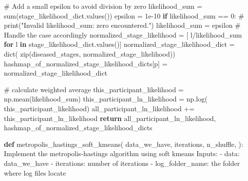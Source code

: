 \documentclass[
  letterpaper,
  DIV=11,
  numbers=noendperiod]{scrreprt}
\newenvironment{Shaded}{\begin{snugshade}}{\end{snugshade}}
\newcommand{\BuiltInTok}[1]{\textcolor[rgb]{0.00,0.23,0.31}{#1}}
\newcommand{\CommentTok}[1]{\textcolor[rgb]{0.37,0.37,0.37}{#1}}
\newcommand{\ControlFlowTok}[1]{\textcolor[rgb]{0.00,0.23,0.31}{\textbf{#1}}}
\newcommand{\DecValTok}[1]{\textcolor[rgb]{0.68,0.00,0.00}{#1}}
\newcommand{\FloatTok}[1]{\textcolor[rgb]{0.68,0.00,0.00}{#1}}
\newcommand{\KeywordTok}[1]{\textcolor[rgb]{0.00,0.23,0.31}{\textbf{#1}}}
\newcommand{\NormalTok}[1]{\textcolor[rgb]{0.00,0.23,0.31}{#1}}
\newcommand{\OperatorTok}[1]{\textcolor[rgb]{0.37,0.37,0.37}{#1}}
\begin{document}
\begin{Shaded}
\begin{Highlighting}[]
            \CommentTok{\# Add a small epsilon to avoid division by zero}
\NormalTok{            likelihood\_sum }\OperatorTok{=} \BuiltInTok{sum}\NormalTok{(stage\_likelihood\_dict.values())}
\NormalTok{            epsilon }\OperatorTok{=} \FloatTok{1e{-}10}
            \ControlFlowTok{if}\NormalTok{ likelihood\_sum }\OperatorTok{==} \DecValTok{0}\NormalTok{:}
                \CommentTok{\# print("Invalid likelihood\_sum: zero encountered.")}
\NormalTok{                likelihood\_sum }\OperatorTok{=}\NormalTok{ epsilon  }\CommentTok{\# Handle the case accordingly}
\NormalTok{            normalized\_stage\_likelihood }\OperatorTok{=}\NormalTok{ [}
\NormalTok{                l}\OperatorTok{/}\NormalTok{likelihood\_sum }\ControlFlowTok{for}\NormalTok{ l }\KeywordTok{in}\NormalTok{ stage\_likelihood\_dict.values()]}
\NormalTok{            normalized\_stage\_likelihood\_dict }\OperatorTok{=} \BuiltInTok{dict}\NormalTok{(}
                \BuiltInTok{zip}\NormalTok{(diseased\_stages, normalized\_stage\_likelihood))}
\NormalTok{            hashmap\_of\_normalized\_stage\_likelihood\_dicts[p] }\OperatorTok{=}\NormalTok{ normalized\_stage\_likelihood\_dict}

            \CommentTok{\# calculate weighted average}
\NormalTok{            this\_participant\_likelihood }\OperatorTok{=}\NormalTok{ np.mean(likelihood\_sum)}
\NormalTok{            this\_participant\_ln\_likelihood }\OperatorTok{=}\NormalTok{ np.log(}
\NormalTok{                this\_participant\_likelihood)}
\NormalTok{        all\_participant\_ln\_likelihood }\OperatorTok{+=}\NormalTok{ this\_participant\_ln\_likelihood}
    \ControlFlowTok{return}\NormalTok{ all\_participant\_ln\_likelihood, hashmap\_of\_normalized\_stage\_likelihood\_dicts}


\KeywordTok{def}\NormalTok{ metropolis\_hastings\_soft\_kmeans(}
\NormalTok{    data\_we\_have,}
\NormalTok{    iterations,}
\NormalTok{    n\_shuffle,}
\NormalTok{):}
    \CommentTok{\textquotesingle{}\textquotesingle{}\textquotesingle{}Implement the metropolis{-}hastings algorithm using soft kmeans}
\CommentTok{    Inputs: }
\CommentTok{        {-} data: data\_we\_have}
\CommentTok{        {-} iterations: number of iterations}
\CommentTok{        {-} log\_folder\_name: the folder where log files locate}


\end{Highlighting}
\end{Shaded}
\end{document}
